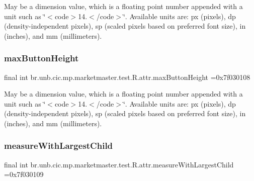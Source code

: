May be a dimension value, which is a floating point number appended with a unit such as \char`\"{}$<$code$>$14.\+5sp$<$/code$>$\char`\"{}. Available units are\+: px (pixels), dp (density-\/independent pixels), sp (scaled pixels based on preferred font size), in (inches), and mm (millimeters). \mbox{\label{classbr_1_1unb_1_1cic_1_1mp_1_1marketmaster_1_1test_1_1R_1_1attr_af382a757b6058c9a134ab51a6490eb78}} 
\subsubsection{\texorpdfstring{max\+Button\+Height}{maxButtonHeight}}
{\footnotesize\ttfamily final int br.\+unb.\+cic.\+mp.\+marketmaster.\+test.\+R.\+attr.\+max\+Button\+Height =0x7f030108\hspace{0.3cm}{\ttfamily [static]}}

May be a dimension value, which is a floating point number appended with a unit such as \char`\"{}$<$code$>$14.\+5sp$<$/code$>$\char`\"{}. Available units are\+: px (pixels), dp (density-\/independent pixels), sp (scaled pixels based on preferred font size), in (inches), and mm (millimeters). \mbox{\label{classbr_1_1unb_1_1cic_1_1mp_1_1marketmaster_1_1test_1_1R_1_1attr_ac3f336035c2928b7242befdaf4c73262}} 
\subsubsection{\texorpdfstring{measure\+With\+Largest\+Child}{measureWithLargestChild}}
{\footnotesize\ttfamily final int br.\+unb.\+cic.\+mp.\+marketmaster.\+test.\+R.\+attr.\+measure\+With\+Largest\+Child =0x7f030109\hspace{0.3cm}{\ttfamily [static]}}

